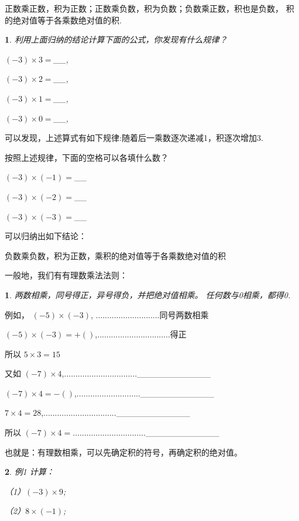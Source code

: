 \documentclass{article}
\newtheorem{propertory}{ }
\newtheorem{example}{ }
\begin{document}
\begin{article}
正数乘正数，积为正数；正数乘负数，积为负数；负数乘正数，积也是负数，
积的绝对值等于各乘数绝对值的积.

\begin{example}

利用上面归纳的结论计算下面的公式，你发现有什么规律？

$(-3)\times3=$__,

$(-3)\times2=$__,

$(-3)\times1=$__,

$(-3)\times0=$__,

\end{example}

可以发现，上述算式有如下规律:随着后一乘数逐次递减1，积逐次增加3.

按照上述规律，下面的空格可以各填什么数？

$(-3)\times(-1)=$__

$(-3)\times(-2)=$__

$(-3)\times(-3)=$__

可以归纳出如下结论：

负数乘负数，积为正数，乘积的绝对值等于各乘数绝对值的积

一般地，我们有有理数乘法法则：

\begin{propertory}
两数相乘，同号得正，异号得负，并把绝对值相乘。
任何数与0相乘，都得0.
\end{propertory}


例如，  $(-5)\times(-3)$, ............................同号两数相乘

        $(-5)\times(-3)=+( )$,................................得正
        
所以    $5\times3=15$

又如    $(-7)\times4$,................................____________

        $(-7)\times4=-()$,............................____________
        
        $7\times4=28$,................................____________
        
所以    $(-7)\times4=$................................____________        

也就是：有理数相乘，可以先确定积的符号，再确定积的绝对值。

\begin{example}

例1 计算：

（1）$(-3)\times9$;

（2）$8\times(-1)$;


\end{example}
\end{article}
\end{document}
